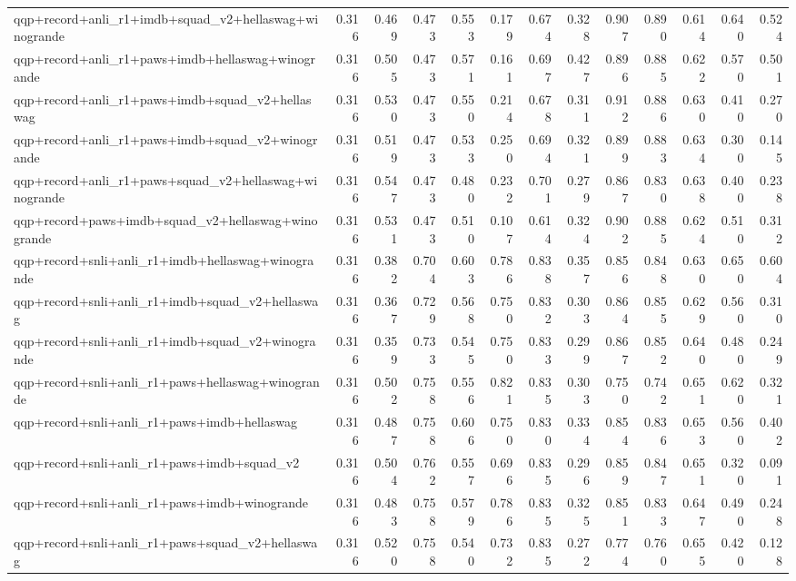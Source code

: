 \begin{table}[t]
\begin{tabular}{lrrrrrrrrrrrr}
    qqp+record+anli\_r1+imdb+squad\_v2+hellaswag+winogrande & 0.316 & 0.469 & 0.473 & 0.553 & 0.179 & 0.674 & 0.328 & 0.907 & 0.890 & 0.614 & 0.640 & 0.524 \\
    qqp+record+anli\_r1+paws+imdb+hellaswag+winogrande & 0.316 & 0.505 & 0.473 & 0.571 & 0.161 & 0.697 & 0.427 & 0.896 & 0.885 & 0.622 & 0.570 & 0.501 \\
    qqp+record+anli\_r1+paws+imdb+squad\_v2+hellaswag & 0.316 & 0.530 & 0.473 & 0.550 & 0.214 & 0.678 & 0.311 & 0.912 & 0.886 & 0.630 & 0.410 & 0.270 \\
    qqp+record+anli\_r1+paws+imdb+squad\_v2+winogrande & 0.316 & 0.519 & 0.473 & 0.533 & 0.250 & 0.694 & 0.321 & 0.899 & 0.883 & 0.634 & 0.300 & 0.145 \\
    qqp+record+anli\_r1+paws+squad\_v2+hellaswag+winogrande & 0.316 & 0.547 & 0.473 & 0.480 & 0.232 & 0.701 & 0.279 & 0.867 & 0.830 & 0.638 & 0.400 & 0.238 \\
    qqp+record+paws+imdb+squad\_v2+hellaswag+winogrande & 0.316 & 0.531 & 0.473 & 0.510 & 0.107 & 0.614 & 0.324 & 0.902 & 0.885 & 0.624 & 0.510 & 0.312 \\
    qqp+record+snli+anli\_r1+imdb+hellaswag+winogrande & 0.316 & 0.382 & 0.704 & 0.603 & 0.786 & 0.838 & 0.357 & 0.856 & 0.848 & 0.630 & 0.650 & 0.604 \\
    qqp+record+snli+anli\_r1+imdb+squad\_v2+hellaswag & 0.316 & 0.367 & 0.729 & 0.568 & 0.750 & 0.832 & 0.303 & 0.864 & 0.855 & 0.629 & 0.560 & 0.310 \\
    qqp+record+snli+anli\_r1+imdb+squad\_v2+winogrande & 0.316 & 0.359 & 0.733 & 0.545 & 0.750 & 0.833 & 0.299 & 0.867 & 0.852 & 0.640 & 0.480 & 0.249 \\
    qqp+record+snli+anli\_r1+paws+hellaswag+winogrande & 0.316 & 0.502 & 0.758 & 0.556 & 0.821 & 0.835 & 0.303 & 0.750 & 0.742 & 0.651 & 0.620 & 0.321 \\
    qqp+record+snli+anli\_r1+paws+imdb+hellaswag & 0.316 & 0.487 & 0.758 & 0.606 & 0.750 & 0.830 & 0.334 & 0.854 & 0.836 & 0.653 & 0.560 & 0.402 \\
    qqp+record+snli+anli\_r1+paws+imdb+squad\_v2 & 0.316 & 0.504 & 0.762 & 0.557 & 0.696 & 0.835 & 0.296 & 0.859 & 0.847 & 0.651 & 0.320 & 0.091 \\
    qqp+record+snli+anli\_r1+paws+imdb+winogrande & 0.316 & 0.483 & 0.758 & 0.579 & 0.786 & 0.835 & 0.325 & 0.851 & 0.833 & 0.647 & 0.490 & 0.248 \\
    qqp+record+snli+anli\_r1+paws+squad\_v2+hellaswag & 0.316 & 0.520 & 0.758 & 0.540 & 0.732 & 0.835 & 0.272 & 0.774 & 0.760 & 0.655 & 0.420 & 0.128 \\

\end{tabular}
\end{table}

